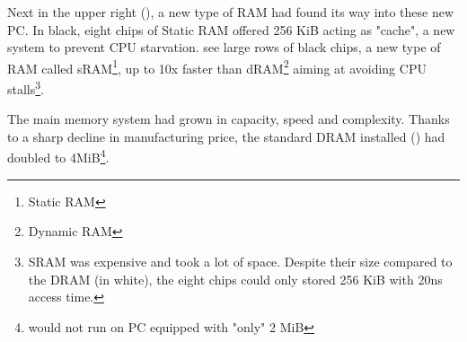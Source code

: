 \par
 Next in the upper right (), a new type of RAM had found its way into these new PC. In black, eight chips of Static RAM offered 256 KiB acting as "cache", a new system to prevent CPU starvation. see large rows of black chips, a new type of RAM called sRAM\footnote{Static RAM}, up to 10x faster than dRAM\footnote{Dynamic RAM} aiming at avoiding CPU stalls\footnote{SRAM was expensive and took a lot of space. Despite their size compared to the DRAM (in white), the eight chips could only stored 256 KiB with 20ns access time.}. \\
\par
The main memory system had grown in capacity, speed and complexity. Thanks to a sharp decline in manufacturing price, the standard DRAM installed () had doubled to 4MiB\footnote{\doom would not run on PC equipped with "only" 2 MiB}.\\
\par

